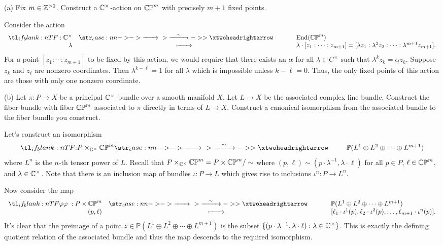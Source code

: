 \documentclass{../../templates/lkx_pset}
\begin{document}
\begin{problem}{6}
\end{problem}
\begin{parts}
  \begin{part}{(a)}
    Fix $m\in \mathbb{Z}^{>0}$. Construct a $\mathbb{C}^\times$-action on $\mathbb{CP}^m$ with precisely $m+1$ fixed points.
  \end{part}

    Consider the action
    \[
      \lkxfunc{}{\C^\times}{\End(\CP^m)}{\lambda}{\lambda\cdot[z_1:\cdots:z_{m+1}] = [\lambda z_1 : \lambda^2 z_2 : \cdots : \lambda^{m+1} z_{m+1}].}
    \]
    For a point $[z_1: \cdots : z_{m+1}]$ to be fixed by this action, we would require that there exists an $\alpha$ for all $\lambda\in C^\times$ such that $\lambda^k z_k = \alpha z_k$. Suppose $z_k$ and $z_\ell$ are nonzero coordinates. Then $\lambda^{k-\ell} = 1$ for all $\lambda$ which is impossible unless $k-\ell = 0$. Thus, the only fixed points of this action are those with only one nonzero coordinate.

  \begin{part}{(b)}
    Let $\pi : P \to X$ be a principal $\mathbb{C}^\times$-bundle over a smooth manifold $X$. Let $L \to X$ be the associated complex line bundle. Construct the fiber bundle with fiber $\mathbb{CP}^m$ associated to $\pi$ directly in terms of $L\to X$. Construct a canonical isomorphism from the associated bundle to the fiber bundle you construct.
  \end{part}

  Let's construct an isomorphism
  \[
    \lkxfunc{}{P\times_{\C^\times} \CP^m}{\mathbb{P}(L^1\oplus L^2\oplus \cdots \oplus L^{m+1})}
  \]
  where $L^n$ is the $n$-th tensor power of $L$. Recall that $P\times_{\mathbb{C}^\times} \mathbb{CP}^m = P\times \mathbb{CP}^m/\sim$ where $(p,\ell)\sim (p\cdot \lambda^{-1}, \lambda\cdot \ell)$ for all $p\in P$, $\ell\in \mathbb{CP}^m$, and $\lambda\in\mathbb{C}^\times$. Note that there is an inclusion map of bundles $\iota : P \to L$ which gives rise to inclusions $\iota^n : P \to L^n$.

  Now consider the map
  \[
    \lkxfunc{\varphi}{P\times \CP^m}{\mathbb{P}(L^1\oplus L^2\oplus \cdots \oplus L^{m+1})}{(p,\ell)}{[\ell_1\cdot \iota^1(p),\ell_2\cdot \iota^2(p),\ldots,\ell_{m+1}\cdot \iota^n(p)].}
  \]
  It's clear that the preimage of a point $z \in \mathbb{P}(L^1\oplus L^2\oplus\cdots\oplus L^{m+1})$ is the subset $\{(p\cdot \lambda^{-1},\lambda\cdot \ell) : \lambda \in \mathbb{C}^\times\}$. This is exactly the defining quotient relation of the associated bundle and thus the map descends to the required isomorphism.


\end{parts}
\end{document}
